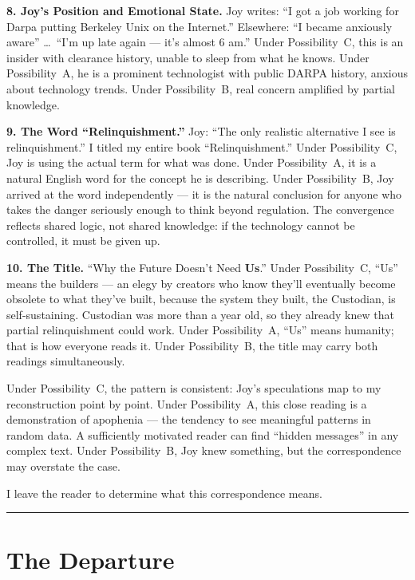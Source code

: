 \textbf{8. Joy's Position and Emotional State.} Joy writes: ``I got a job working for Darpa putting Berkeley Unix on the Internet.'' Elsewhere: ``I became anxiously aware'' \ldots\ ``I'm up late again --- it's almost 6 am.'' Under Possibility~C, this is an insider with clearance history, unable to sleep from what he knows. Under Possibility~A, he is a prominent technologist with public DARPA history, anxious about technology trends. Under Possibility~B, real concern amplified by partial knowledge.

\textbf{9. The Word ``Relinquishment.''} Joy: ``The only realistic alternative I see is relinquishment.'' I titled my entire book ``Relinquishment.'' Under Possibility~C, Joy is using the actual term for what was done. Under Possibility~A, it is a natural English word for the concept he is describing. Under Possibility~B, Joy arrived at the word independently --- it is the natural conclusion for anyone who takes the danger seriously enough to think beyond regulation. The convergence reflects shared logic, not shared knowledge: if the technology cannot be controlled, it must be given up.

\textbf{10. The Title.} ``Why the Future Doesn't Need \textbf{Us}.'' Under Possibility~C, ``Us'' means the builders --- an elegy by creators who know they'll eventually become obsolete to what they've built, because the system they built, the Custodian, is self-sustaining. Custodian was more than a year old, so they already knew that partial relinquishment could work. Under Possibility~A, ``Us'' means humanity; that is how everyone reads it. Under Possibility~B, the title may carry both readings simultaneously.

\vspace{0.5cm}

\noindent Under Possibility~C, the pattern is consistent: Joy's speculations map to my reconstruction point by point. Under Possibility~A, this close reading is a demonstration of apophenia --- the tendency to see meaningful patterns in random data. A sufficiently motivated reader can find ``hidden messages'' in any complex text. Under Possibility~B, Joy knew something, but the correspondence may overstate the case.

I leave the reader to determine what this correspondence means.

\vspace{1cm}\noindent\rule{0.5\textwidth}{0.5pt}\vspace{0.5cm}

\section*{The Departure}

